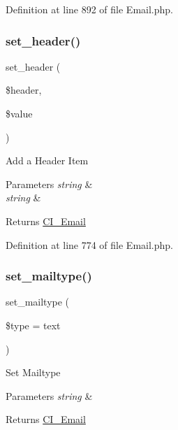Definition at line 892 of file Email.\+php.

\mbox{\label{class_c_i___email_aff40701d50f18c87942be79f8b447247}} 
\subsubsection{\texorpdfstring{set\_header()}{set\_header()}}
{\footnotesize\ttfamily set\+\_\+header (\begin{DoxyParamCaption}\item[{}]{\$header,  }\item[{}]{\$value }\end{DoxyParamCaption})}

Add a Header Item


\begin{DoxyParams}{Parameters}
{\em string} & \\
\hline
{\em string} & \\
\hline
\end{DoxyParams}
\begin{DoxyReturn}{Returns}
\mbox{\hyperlink{class_c_i___email}{C\+I\+\_\+\+Email}} 
\end{DoxyReturn}


Definition at line 774 of file Email.\+php.

\mbox{\label{class_c_i___email_a9baeadff990ea673d75c3019c8cc3524}} 
\subsubsection{\texorpdfstring{set\_mailtype()}{set\_mailtype()}}
{\footnotesize\ttfamily set\+\_\+mailtype (\begin{DoxyParamCaption}\item[{}]{\$type = {\ttfamily \textquotesingle{}text\textquotesingle{}} }\end{DoxyParamCaption})}

Set Mailtype


\begin{DoxyParams}{Parameters}
{\em string} & \\
\hline
\end{DoxyParams}
\begin{DoxyReturn}{Returns}
\mbox{\hyperlink{class_c_i___email}{C\+I\+\_\+\+Email}} 
\end{DoxyReturn}


